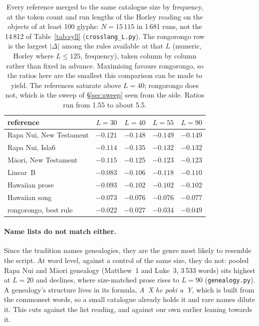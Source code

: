 \documentclass[11pt,a4paper]{article}
\begin{document}
\begin{table}[t]
\centering\small
\begin{tabular}{l rrrr}
\toprule
reference & $L=30$ & $L=40$ & $L=55$ & $L=90$ \\
\midrule
Rapa Nui, New Testament & $-0.121$ & $-0.148$ & $-0.149$ & $-0.149$ \\
Rapa Nui, Isla6         & $-0.114$ & $-0.135$ & $-0.132$ & $-0.132$ \\
M\=aori, New Testament  & $-0.115$ & $-0.125$ & $-0.123$ & $-0.123$ \\
Linear~B                & $-0.083$ & $-0.106$ & $-0.118$ & $-0.110$ \\
Hawaiian prose          & $-0.093$ & $-0.102$ & $-0.102$ & $-0.102$ \\
Hawaiian song           & $-0.073$ & $-0.076$ & $-0.076$ & $-0.077$ \\
\midrule
rongorongo, best rule   & $-0.022$ & $-0.027$ & $-0.034$ & $-0.049$ \\
\bottomrule
\end{tabular}
\caption{Every reference merged to the same catalogue size by frequency, at the token count and run lengths of the Horley reading on the objects of at least 100 glyphs: $N=15\,115$ in 1\,681 runs, not the 14\,812 of Table~\ref{tab:syll} (\texttt{crosslang\_L.py}). The rongorongo row is the largest $|\Delta|$ among the rules available at that $L$ (numeric, Horley where $L\le125$, frequency), taken column by column rather than fixed in advance. Maximising favours rongorongo, so the ratios here are the smallest this comparison can be made to yield. The references saturate above $L=40$; rongorongo does not, which is the sweep of \S\ref{sec:sweep} seen from the side. Ratios run from 1.55 to about 5.5.}
\label{tab:crosslang}
\end{table}

\paragraph{Name lists do not match either.} Since the tradition names genealogies, they are the genre most likely to resemble the script. At word level, against a control of the same size, they do not: pooled Rapa Nui and M\=aori genealogy (Matthew~1 and Luke~3, 3\,533 words) sits highest at $L=20$ and declines, where size-matched prose rises to $L=90$ (\texttt{genealogy.py}). A genealogy's structure lives in its formula, \emph{A~X he poki \textquotesingle{}a~Y}, which is built from the commonest words, so a small catalogue already holds it and rare names dilute it. This cuts against the list reading, and against our own earlier leaning towards it.
\end{document}
